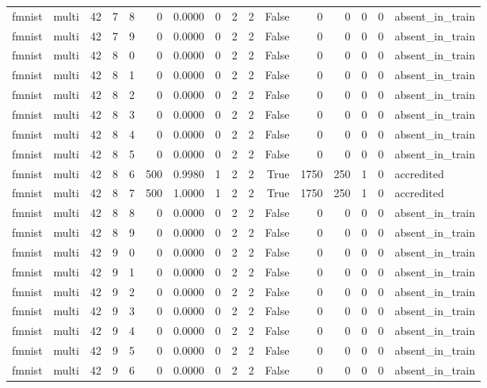 \begin{tabular}{llrrrrrrrrrrrrrl}
fmnist & multi & 42 & 7 & 8 & 0 & 0.0000 & 0 & 2 & 2 & False & 0 & 0 & 0 & 0 & absent\_in\_train \\
fmnist & multi & 42 & 7 & 9 & 0 & 0.0000 & 0 & 2 & 2 & False & 0 & 0 & 0 & 0 & absent\_in\_train \\
fmnist & multi & 42 & 8 & 0 & 0 & 0.0000 & 0 & 2 & 2 & False & 0 & 0 & 0 & 0 & absent\_in\_train \\
fmnist & multi & 42 & 8 & 1 & 0 & 0.0000 & 0 & 2 & 2 & False & 0 & 0 & 0 & 0 & absent\_in\_train \\
fmnist & multi & 42 & 8 & 2 & 0 & 0.0000 & 0 & 2 & 2 & False & 0 & 0 & 0 & 0 & absent\_in\_train \\
fmnist & multi & 42 & 8 & 3 & 0 & 0.0000 & 0 & 2 & 2 & False & 0 & 0 & 0 & 0 & absent\_in\_train \\
fmnist & multi & 42 & 8 & 4 & 0 & 0.0000 & 0 & 2 & 2 & False & 0 & 0 & 0 & 0 & absent\_in\_train \\
fmnist & multi & 42 & 8 & 5 & 0 & 0.0000 & 0 & 2 & 2 & False & 0 & 0 & 0 & 0 & absent\_in\_train \\
fmnist & multi & 42 & 8 & 6 & 500 & 0.9980 & 1 & 2 & 2 & True & 1750 & 250 & 1 & 0 & accredited \\
fmnist & multi & 42 & 8 & 7 & 500 & 1.0000 & 1 & 2 & 2 & True & 1750 & 250 & 1 & 0 & accredited \\
fmnist & multi & 42 & 8 & 8 & 0 & 0.0000 & 0 & 2 & 2 & False & 0 & 0 & 0 & 0 & absent\_in\_train \\
fmnist & multi & 42 & 8 & 9 & 0 & 0.0000 & 0 & 2 & 2 & False & 0 & 0 & 0 & 0 & absent\_in\_train \\
fmnist & multi & 42 & 9 & 0 & 0 & 0.0000 & 0 & 2 & 2 & False & 0 & 0 & 0 & 0 & absent\_in\_train \\
fmnist & multi & 42 & 9 & 1 & 0 & 0.0000 & 0 & 2 & 2 & False & 0 & 0 & 0 & 0 & absent\_in\_train \\
fmnist & multi & 42 & 9 & 2 & 0 & 0.0000 & 0 & 2 & 2 & False & 0 & 0 & 0 & 0 & absent\_in\_train \\
fmnist & multi & 42 & 9 & 3 & 0 & 0.0000 & 0 & 2 & 2 & False & 0 & 0 & 0 & 0 & absent\_in\_train \\
fmnist & multi & 42 & 9 & 4 & 0 & 0.0000 & 0 & 2 & 2 & False & 0 & 0 & 0 & 0 & absent\_in\_train \\
fmnist & multi & 42 & 9 & 5 & 0 & 0.0000 & 0 & 2 & 2 & False & 0 & 0 & 0 & 0 & absent\_in\_train \\
fmnist & multi & 42 & 9 & 6 & 0 & 0.0000 & 0 & 2 & 2 & False & 0 & 0 & 0 & 0 & absent\_in\_train \\

\end{tabular}
